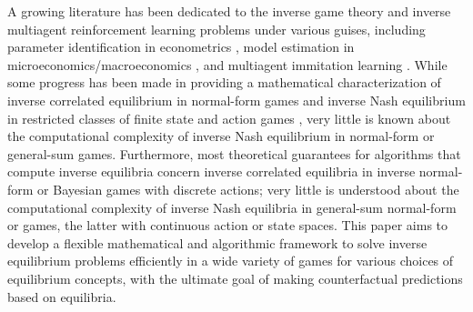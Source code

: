 A growing literature has been dedicated to the inverse game theory and inverse multiagent reinforcement learning problems under various guises, including parameter identification in econometrics \citep{wright1928tariff, syrgkanis2017inference}, model estimation in microeconomics/macroeconomics \citep{taylor1979estimation}, and multiagent immitation learning \citep{song2018multi}.
While some progress has been made in providing a mathematical characterization of inverse correlated equilibrium in normal-form games \citep{waugh2013computational, kuleshov2015inverse, syrgkanis2017inference} and inverse Nash equilibrium in restricted classes of finite state and action  games \citep{lin2017multiagent, lin2019multi}, very little is known about the computational complexity of inverse Nash equilibrium in normal-form or general-sum  games.
Furthermore, most theoretical guarantees for algorithms that compute inverse equilibria concern inverse correlated equilibria in inverse normal-form or Bayesian games with discrete actions; very little is understood about the computational complexity of inverse Nash equilibria in general-sum normal-form or  games, the latter with continuous action or state spaces.
This paper aims to develop a flexible mathematical and algorithmic framework to solve inverse equilibrium problems efficiently in a wide variety of games for various choices of equilibrium concepts, with the ultimate goal of making counterfactual predictions based on  equilibria.



